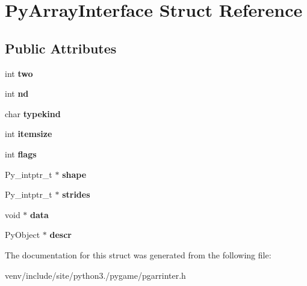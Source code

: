 \hypertarget{struct_py_array_interface}{}\section{Py\+Array\+Interface Struct Reference}
\label{struct_py_array_interface}
\subsection*{Public Attributes}
\begin{DoxyCompactItemize}
\item 
\mbox{\label{struct_py_array_interface_ab6d24fbafdbe601ef3c77720ffecb470}} 
int {\bfseries two}
\item 
\mbox{\label{struct_py_array_interface_a7d5208cc0c4f5bcaaeff6e1bf02e35e3}} 
int {\bfseries nd}
\item 
\mbox{\label{struct_py_array_interface_aae32b9e36b1b8fead0c2f69f2c5b899f}} 
char {\bfseries typekind}
\item 
\mbox{\label{struct_py_array_interface_a175d53ca477bddfa28d6d0651bdb1a67}} 
int {\bfseries itemsize}
\item 
\mbox{\label{struct_py_array_interface_ae4f40681a287c2abd1b36e9a660a1ad3}} 
int {\bfseries flags}
\item 
\mbox{\label{struct_py_array_interface_a2b483e45d797da7b8da5c8eb2e176913}} 
Py\+\_\+intptr\+\_\+t $\ast$ {\bfseries shape}
\item 
\mbox{\label{struct_py_array_interface_a31bddfdd7a448ee4cf4e94c1978b485c}} 
Py\+\_\+intptr\+\_\+t $\ast$ {\bfseries strides}
\item 
\mbox{\label{struct_py_array_interface_a95a1efdd290ee7c788220b3802ccd717}} 
void $\ast$ {\bfseries data}
\item 
\mbox{\label{struct_py_array_interface_a7d517913182eeea2ee7cdb4803185cd6}} 
Py\+Object $\ast$ {\bfseries descr}
\end{DoxyCompactItemize}


The documentation for this struct was generated from the following file\+:\begin{DoxyCompactItemize}
\item 
venv/include/site/python3./pygame/pgarrinter.\+h\end{DoxyCompactItemize}
